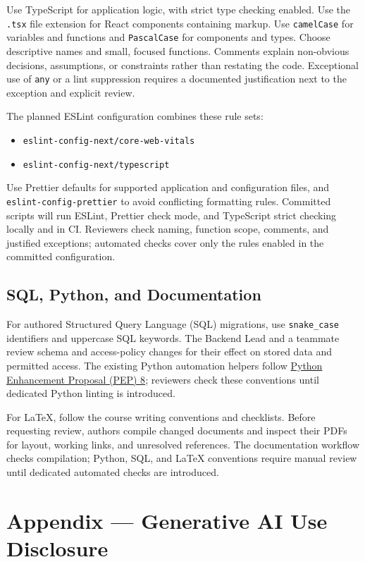 \documentclass{article}
\begin{document}
Use TypeScript for application logic, with strict type checking
enabled. Use the \texttt{.tsx} file extension for React components
containing markup. Use \texttt{camelCase}
for variables and functions and \texttt{PascalCase} for components and types.
Choose descriptive names and small, focused functions. Comments explain
non-obvious decisions, assumptions, or constraints rather than restating
the code. Exceptional use of \texttt{any} or a lint suppression requires
a documented justification next to the exception and explicit review.

The planned ESLint configuration combines these rule sets:
\begin{itemize}
  \item \texttt{eslint-config-next/core-web-vitals}
  \item \texttt{eslint-config-next/typescript}
\end{itemize}
Use Prettier defaults for supported application and configuration files,
and \texttt{eslint-config-prettier}
to avoid conflicting formatting rules. Committed scripts will run ESLint,
Prettier check mode, and TypeScript strict checking locally and in CI.
Reviewers check naming, function scope, comments, and justified exceptions;
automated checks cover only the rules enabled in the committed configuration.

\subsection{SQL, Python, and Documentation}

For authored Structured Query Language (SQL) migrations, use
\texttt{snake\_case} identifiers and uppercase SQL keywords. The Backend
Lead and a teammate review schema and access-policy changes for their effect
on stored data and permitted access. The existing Python automation helpers
follow \href{https://peps.python.org/pep-0008/}
{Python Enhancement Proposal (PEP) 8}; reviewers check these
conventions until dedicated Python linting is introduced.

For \LaTeX, follow the course writing conventions and checklists.
Before requesting review, authors compile changed documents and
inspect their PDFs for layout, working links, and unresolved references.
The documentation workflow checks compilation; Python, SQL, and
\LaTeX{} conventions require manual review until dedicated automated
checks are introduced.

\newpage{}

\section{Appendix --- Generative AI Use Disclosure}
\end{document}
